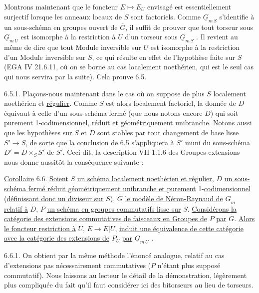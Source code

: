 Montrons maintenant que le foncteur $E \longmapsto E_U$ envisagé est essentiellement surjectif lorsque les anneaux locaux de $S$ sont factoriels. Comme $\underline{G}_{m\,S}$ s'identifie à un sous-schéma en groupes ouvert de $\overline{G}$, il suffit de prouver que tout torseur sous $\underline{G}_{m\,U}$ est isomorphe à la restriction à $U$ d'un torseur sous $\underline{G}_{m\,S}$ . Il revient au même de dire que tout Module inversible sur $U$ est isomorphe à la restriction d'un Module inversible sur $S$, ce qui résulte en effet de l'hypothèse faite sur $S$ (EGA IV 21.6.11, où on se borne au cas localement noethérien, qui est le seul cas qui nous servira par la suite). Cela prouve 6.5.


6.5.1. Plaçons-nous maintenant dans le cas où on suppose de plus $S$ localement noethérien et \underline{régulier}. Comme $S$ est alors localement factoriel, la donnée de $D$ équivaut à celle d'un sous-schéma fermé (que nous notons encore $D$) qui soit purement 1-codimensionnel, réduit et géométriquement unibranche. Notons aussi que les hypothèses sur $S$ et $D$ sont stables par tout changement de base lisse $S' \longrightarrow S$, de sorte que la conclusion de 6.5 s'appliquera à $S'$ muni du sous-schéma $D' = D \times_S S'$ de $S'$. Ceci dit, la description VII 1.1.6 des Groupes extensions nous donne aussitôt la conséquence suivante :

\underline{Corollaire} 6.6. \underline{Soient} $S$ \underline{un schéma localement noethérien et régulier}, $D$ \underline{un sous-schéma fermé réduit géométriquement unibranche et purement} 1-\underline{codimensionnel} (\underline{définissant donc un diviseur sur} $S$), $\overline{G}$ \underline{le modèle de Néron-Raynaud de} $\underline{G}_m$ \underline{relatif à} $D$, $P$ \underline{un schéma en groupes commutatifs lisse sur} $S$. \underline{Considérons la catégorie des extensions commutatives de faisceaux en Groupes de} $P$ \underline{par} $\overline{G}$. \underline{Alors le foncteur restriction à} $U$, $E \longrightarrow E|U$, \underline{induit une équivalence de cette catégorie avec la catégorie des extensions de} $P_U$ \underline{par} $\underline{G}_{m\,U}$ .

6.6.1. On obtient par la même méthode l'énoncé analogue, relatif au cas d'extensions pas nécessairement commutatives ($P$ n'étant plus supposé commutatif). Nous laissons au lecteur le détail de la démonstration, légèrement plus compliquée du fait qu'il faut considérer ici des bitorseurs au lieu de torseurs.

